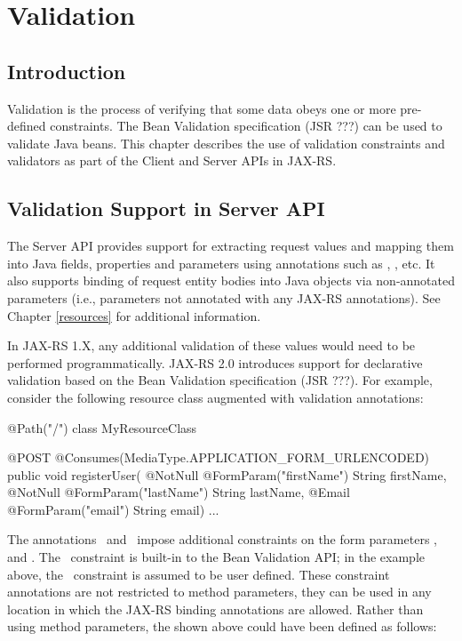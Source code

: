 \chapter{Validation}
\label{validation}

\section{Introduction}
\label{introduction}
Validation is the process of verifying that some data obeys one or more pre-defined constraints. The Bean Validation specification (JSR ???) can be used to validate Java beans. This chapter describes the use of validation constraints and validators as part of the Client and Server APIs in JAX-RS.

\section{Validation Support in Server API}

The Server API provides support for extracting request values and mapping them into Java fields, properties and parameters using annotations such as , , etc. It also supports binding of request entity bodies into Java objects via non-annotated parameters (i.e., parameters not annotated with any JAX-RS annotations). See Chapter \ref{resources} for additional information.

In JAX-RS 1.X, any additional validation of these values would need to be performed programmatically. JAX-RS 2.0 introduces support for declarative validation based on the Bean Validation specification (JSR ???). For example, consider the following resource class augmented with validation annotations:

\begin{listing}{1}
@Path("/")
class MyResourceClass {

    @POST
    @Consumes(MediaType.APPLICATION_FORM_URLENCODED)
    public void registerUser(
        @NotNull @FormParam("firstName") String firstName,
        @NotNull @FormParam("lastName") String lastName,
        @Email @FormParam("email") String email) {
        ...
    }
}
\end{listing}

The annotations \NotNull\ and \Email\ impose additional constraints on the form parameters ,  and . The \NotNull\ constraint is built-in to the Bean Validation API; in the example above, the \Email\ constraint is assumed to be user defined. These constraint annotations are not restricted to method parameters, they can be used in any location in which the JAX-RS binding annotations are allowed. Rather than using method parameters, the  shown above could have been defined as follows:

